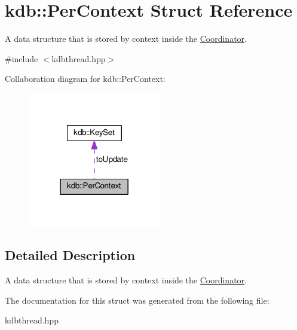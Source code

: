 \hypertarget{structkdb_1_1PerContext}{\section{kdb\+:\+:Per\+Context Struct Reference}
\label{structkdb_1_1PerContext}
}


A data structure that is stored by context inside the \hyperlink{classkdb_1_1Coordinator}{Coordinator}.  




{\ttfamily \#include $<$kdbthread.\+hpp$>$}



Collaboration diagram for kdb\+:\+:Per\+Context\+:
\nopagebreak
\begin{figure}[H]
\begin{center}
\leavevmode
\includegraphics[width=166pt]{structkdb_1_1PerContext__coll__graph}
\end{center}
\end{figure}


\subsection{Detailed Description}
A data structure that is stored by context inside the \hyperlink{classkdb_1_1Coordinator}{Coordinator}. 

The documentation for this struct was generated from the following file\+:\begin{DoxyCompactItemize}
\item 
kdbthread.\+hpp\end{DoxyCompactItemize}
